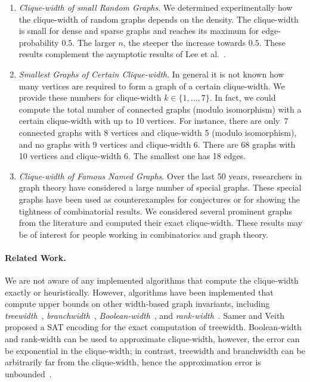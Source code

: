 \documentclass[10pt,usletter]{article}
\theoremstyle{remark}
\begin{document}
\begin{enumerate}
\item \emph{Clique-width of small Random Graphs}.  We determined
  experimentally how the clique-width of random graphs depends on the
  density. The clique-width is small for dense and sparse graphs and
  reaches its maximum for edge-probability $0.5$. The larger $n$, the
  steeper the increase towards $0.5$.  These results complement the
  asymptotic results of Lee et al.~\cite{LeeLeeOum12}.


\item \emph{Smallest Graphs of Certain Clique-width}. In general it is
  not known how many vertices are required to form a graph of a certain
  clique-width. We provide these numbers for clique-width $k\in
  \{1,\dots,7\}$. In fact, we could compute the total number of
  connected graphs (modulo isomorphism) with a certain clique-width
  with up to 10 vertices. For instance, there are only~7 connected
  graphs  with 8 vertices and clique-width 5 (modulo isomorphism),
  and no graphs with 9 vertices and clique-width 6. There are 68 graphs
  with 10 vertices and clique-width 6. The smallest one has 18 edges. 
  
\item \emph{Clique-width of Famous Named Graphs}. Over the last 50
  years, researchers in graph theory have considered a large number of
  special graphs. These special graphs have been used as
  counterexamples for conjectures or for showing the tightness of
  combinatorial results.  We considered several prominent graphs from
  the literature and computed their exact clique-width. These results
  may be of interest for people working in combinatorics and graph
  theory.
\end{enumerate}


\paragraph{Related Work.} We are not aware of any implemented
algorithms that compute the clique-width exactly or
heuristically. However, algorithms have been implemented that compute
upper bounds on other width-based graph invariants, including
\emph{treewidth}~\cite{DowKorf07,GogateDechter04,KosterBodlaenderHoesel01},
\emph{branchwidth}~\cite{SmithUlusalHicks12},
\emph{Boolean-width}~\cite{HvidevoldEtal11}, and
\emph{rank-width}~\cite{Beyss2013}.  Samer and Veith
\cite{SamerVeith09} proposed a SAT encoding for the exact computation
of treewidth.  Boolean-width and rank-width can be used to approximate
clique-width, however, the error can be exponential in the
clique-width; in contrast, treewidth and branchwidth can be
arbitrarily far from the clique-width, hence the approximation error
is unbounded~\cite{BuixuanTelleVatshelle11}.
\end{document}
